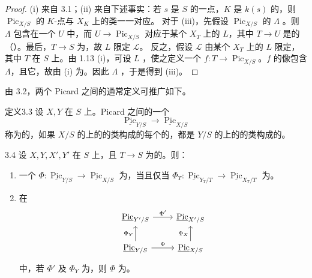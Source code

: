\begin{proof}
(i) 来自 3.1；(ii) 来自下述事实：若 $s$ 是 $S$ 的一点，$K$ 是 $k(s)$ 的，则 $\operatorname{Pic}_{X/S}$ 的 $K$-点与 $X_K$ 上的类一一对应。
对于 (iii)，先假设 $\operatorname{Pic}_{X/S}$ 的 $\Lambda$ 。则 $\Lambda$ 包含在一个 $U$ 中，而 $U\to\operatorname{Pic}_{X/S}$ 对应于某个 $X_T$ 上的 $L$，其中 $T\to U$ 是的（）。最后，$T\to S$ 为，故 $L$ 限定 $\mathscr L$。
反之，假设 $\mathscr L$ 由某个 $X_T$ 上的 $L$ 限定，其中 $T$ 在 $S$ 上。由 1.13 (i)，可设 $L$ ，使之定义一个 $f:T\to\operatorname{Pic}_{X/S}$。$f$ 的像包含 $\Lambda$，且它，故由 (i) 为。因此 $\Lambda$ ，于是得到 (iii)。
\end{proof}
由 3.2，两个 Picard 之间的通常定义可推广如下。
\begin{SGAresult}{定义}{3.3}
设 $X,Y$ 在 $S$ 上。Picard 之间的一个
\[\underline{\operatorname{Pic}}_{Y/S}\longrightarrow\underline{\operatorname{Pic}}_{X/S}\]
称为的，如果 $X/S$ 的上的的类构成的每个的，都是 $Y/S$ 的上的的类构成的。
\end{SGAresult}
\begin{SGAresult}{}{3.4}
设 $X,Y,X',Y'$ 在 $S$ 上，且 $T\to S$ 为的。则：
\begin{enumerate}
\item[(i)] 一个 $\Phi:\underline{\operatorname{Pic}}_{Y/S}\to\underline{\operatorname{Pic}}_{X/S}$ 为，当且仅当 $\Phi_T:\underline{\operatorname{Pic}}_{Y_T/T}\to\underline{\operatorname{Pic}}_{X_T/T}$ 为。
\item[(ii)] 在
\[
\begin{tikzcd}
\underline{\operatorname{Pic}}_{Y'/S}\arrow[r,"\Phi'"]&\underline{\operatorname{Pic}}_{X'/S}\\
\underline{\operatorname{Pic}}_{Y/S}\arrow[u,"\Phi_Y"]\arrow[r,"\Phi"]&\underline{\operatorname{Pic}}_{X/S}\arrow[u,"\Phi_X"]
\end{tikzcd}
\]
中，若 $\Phi'$ 及 $\Phi_Y$ 为，则 $\Phi$ 为。
\end{enumerate}
\end{SGAresult}
